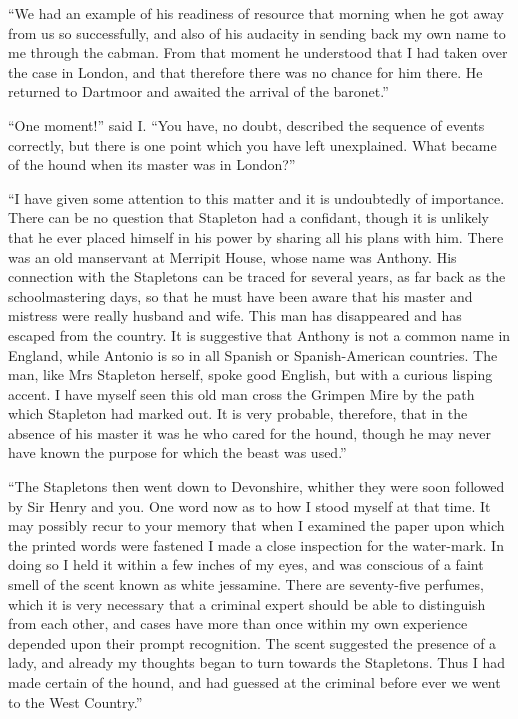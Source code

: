 \documentclass[paper=a5,BCOR=7mm,twoside,DIV=calc,12pt,usegeometry,openany,chapterprefix,endperiod,headings=big]{scrbook} %
\begin{document}
\enquote{We had an example of his readiness of resource that morning when he got away from us so successfully, and also of his audacity in sending back my own name to me through the cabman. From that moment he understood that I had taken over the case in London, and that therefore there was no chance for him there. He returned to Dartmoor and awaited the arrival of the baronet.}

\enquote{One moment!} said I. \enquote{You have, no doubt, described the sequence of events correctly, but there is one point which you have left unexplained. What became of the hound when its master was in London?}

\enquote{I have given some attention to this matter and it is undoubtedly of importance. There can be no question that Stapleton had a confidant, though it is unlikely that he ever placed himself in his power by sharing all his plans with him. There was an old manservant at Merripit House, whose name was Anthony. His connection with the Stapletons can be traced for several years, as far back as the schoolmastering days, so that he must have been aware that his master and mistress were really husband and wife. This man has disappeared and has escaped from the country. It is suggestive that Anthony is not a common name in England, while Antonio is so in all Spanish or Spanish-American countries. The man, like Mrs Stapleton herself, spoke good English, but with a curious lisping accent. I have myself seen this old man cross the Grimpen Mire by the path which Stapleton had marked out. It is very probable, therefore, that in the absence of his master it was he who cared for the hound, though he may never have known the purpose for which the beast was used.}

\enquote{The Stapletons then went down to Devonshire, whither they were soon followed by Sir Henry and you. One word now as to how I stood myself at that time. It may possibly recur to your memory that when I examined the paper upon which the printed words were fastened I made a close inspection for the water-mark. In doing so I held it within a few inches of my eyes, and was conscious of a faint smell of the scent known as white jessamine. There are seventy-five perfumes, which it is very necessary that a criminal expert should be able to distinguish from each other, and cases have more than once within my own experience depended upon their prompt recognition. The scent suggested the presence of a lady, and already my thoughts began to turn towards the Stapletons. Thus I had made certain of the hound, and had guessed at the criminal before ever we went to the West Country.}
\end{document}
